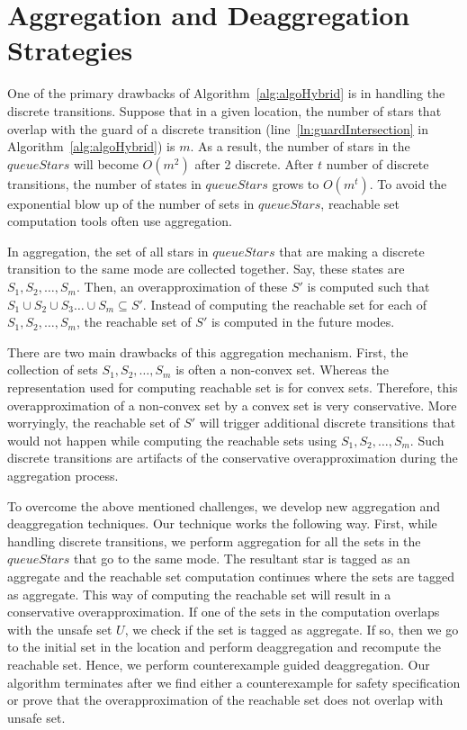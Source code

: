 \section{Aggregation and Deaggregation Strategies}
\label{sec:agdag}

One of the primary drawbacks of Algorithm~\ref{alg:algoHybrid} is in handling the discrete transitions. 
%
Suppose that in a given location, the number of stars that overlap with the guard of a discrete transition (line~\ref{ln:guardIntersection} in Algorithm~\ref{alg:algoHybrid}) is $m$.
%
As a result, the number of stars in the $queueStars$ will become $O(m^2)$ after 2 discrete. After $t$ number of discrete transitions, the number of states in $queueStars$ grows to $O(m^t)$.
%
To avoid the exponential blow up of the number of sets in $queueStars$, reachable set computation tools often use aggregation.

In aggregation, the set of all stars in $queueStars$ that are making a discrete transition to the same mode are collected together. 
%
Say, these states are $S_1, S_2, \ldots, S_m$.
%
Then, an overapproximation of these $S'$ is computed such that $S_1 \cup S_2 \cup S_3 \ldots \cup S_m \subseteq S'$. 
%
Instead of computing the reachable set for each of $S_1, S_2, \ldots, S_m$, the reachable set of $S'$ is computed in the future modes.

There are two main drawbacks of this aggregation mechanism. 
%
First, the collection of sets $S_1, S_2, \ldots, S_m$ is often a non-convex set. 
%
Whereas the representation used for computing reachable set is for convex sets. 
%
Therefore, this overapproximation of a non-convex set by a convex set is very conservative.
%
More worryingly, the reachable set of $S'$ will trigger additional discrete transitions that would not happen while computing the reachable sets using $S_1, S_2, \ldots, S_m$.
%
Such discrete transitions are artifacts of the conservative overapproximation during the aggregation process.


To overcome the above mentioned challenges, we develop new aggregation and deaggregation techniques. Our technique works the following way. 
First, while handling discrete transitions, we perform aggregation for all the sets in the $queueStars$ that go to the same mode. 
%
The resultant star is tagged as an \textsf{aggregate} and the reachable set computation continues where the sets are tagged as \textsf{aggregate}. 
%
This way of computing the reachable set will result in a conservative overapproximation.
%
If one of the sets in the computation overlaps with the unsafe set $U$, we check if the set is tagged as \textsf{aggregate}.
%
If so, then we go to the initial set in the location and perform deaggregation and recompute the reachable set.
%
Hence, we perform counterexample guided deaggregation.
%
Our algorithm terminates after we find either a counterexample for safety specification or prove that the overapproximation of the reachable set does not overlap with unsafe set.

